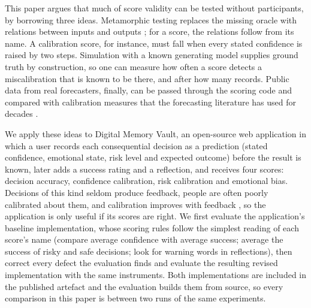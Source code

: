 \documentclass[12pt,a4paper]{article}
\begin{document}
This paper argues that much of score validity can be tested without participants, by borrowing three ideas. Metamorphic testing replaces the missing oracle with relations between inputs and outputs \cite{chen1998,chen2018,segura2016}; for a score, the relations follow from its name. A calibration score, for instance, must fall when every stated confidence is raised by two steps. Simulation with a known generating model supplies ground truth by construction, so one can measure how often a score detects a miscalibration that is known to be there, and after how many records. Public data from real forecasters, finally, can be passed through the scoring code and compared with calibration measures that the forecasting literature has used for decades \cite{brier1950,murphy1973}.

We apply these ideas to Digital Memory Vault, an open-source web application in which a user records each consequential decision as a prediction (stated confidence, emotional state, risk level and expected outcome) before the result is known, later adds a success rating and a reflection, and receives four scores: decision accuracy, confidence calibration, risk calibration and emotional bias. Decisions of this kind seldom produce feedback, people are often poorly calibrated about them, and calibration improves with feedback \cite{lichtenstein1982,moore2008,moore2017}, so the application is only useful if its scores are right. We first evaluate the application's baseline implementation, whose scoring rules follow the simplest reading of each score's name (compare average confidence with average success; average the success of risky and safe decisions; look for warning words in reflections), then correct every defect the evaluation finds and evaluate the resulting revised implementation with the same instruments. Both implementations are included in the published artefact and the evaluation builds them from source, so every comparison in this paper is between two runs of the same experiments.
\end{document}
